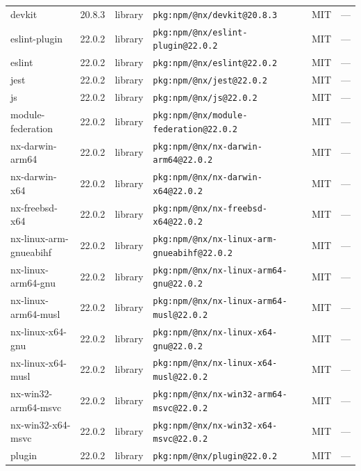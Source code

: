 \documentclass[11pt,a4paper]{article}
\begin{document}
\begin{longtable}{|p{4cm}|p{2cm}|p{1.6cm}|p{5cm}|p{1.5cm}|p{3.5cm}|}
\raggedright devkit & 20.8.3 & library & \small\texttt{pkg:npm/@nx/devkit@20.8.3} & MIT & \small — \\
\raggedright eslint-plugin & 22.0.2 & library & \small\texttt{pkg:npm/@nx/eslint-plugin@22.0.2} & MIT & \small — \\
\raggedright eslint & 22.0.2 & library & \small\texttt{pkg:npm/@nx/eslint@22.0.2} & MIT & \small — \\
\raggedright jest & 22.0.2 & library & \small\texttt{pkg:npm/@nx/jest@22.0.2} & MIT & \small — \\
\raggedright js & 22.0.2 & library & \small\texttt{pkg:npm/@nx/js@22.0.2} & MIT & \small — \\
\raggedright module-federation & 22.0.2 & library & \small\texttt{pkg:npm/@nx/module-federation@22.0.2} & MIT & \small — \\
\raggedright nx-darwin-arm64 & 22.0.2 & library & \small\texttt{pkg:npm/@nx/nx-darwin-arm64@22.0.2} & MIT & \small — \\
\raggedright nx-darwin-x64 & 22.0.2 & library & \small\texttt{pkg:npm/@nx/nx-darwin-x64@22.0.2} & MIT & \small — \\
\raggedright nx-freebsd-x64 & 22.0.2 & library & \small\texttt{pkg:npm/@nx/nx-freebsd-x64@22.0.2} & MIT & \small — \\
\raggedright nx-linux-arm-gnueabihf & 22.0.2 & library & \small\texttt{pkg:npm/@nx/nx-linux-arm-gnueabihf@22.0.2} & MIT & \small — \\
\raggedright nx-linux-arm64-gnu & 22.0.2 & library & \small\texttt{pkg:npm/@nx/nx-linux-arm64-gnu@22.0.2} & MIT & \small — \\
\raggedright nx-linux-arm64-musl & 22.0.2 & library & \small\texttt{pkg:npm/@nx/nx-linux-arm64-musl@22.0.2} & MIT & \small — \\
\raggedright nx-linux-x64-gnu & 22.0.2 & library & \small\texttt{pkg:npm/@nx/nx-linux-x64-gnu@22.0.2} & MIT & \small — \\
\raggedright nx-linux-x64-musl & 22.0.2 & library & \small\texttt{pkg:npm/@nx/nx-linux-x64-musl@22.0.2} & MIT & \small — \\
\raggedright nx-win32-arm64-msvc & 22.0.2 & library & \small\texttt{pkg:npm/@nx/nx-win32-arm64-msvc@22.0.2} & MIT & \small — \\
\raggedright nx-win32-x64-msvc & 22.0.2 & library & \small\texttt{pkg:npm/@nx/nx-win32-x64-msvc@22.0.2} & MIT & \small — \\
\raggedright plugin & 22.0.2 & library & \small\texttt{pkg:npm/@nx/plugin@22.0.2} & MIT & \small — \\

\end{longtable}
\end{document}
